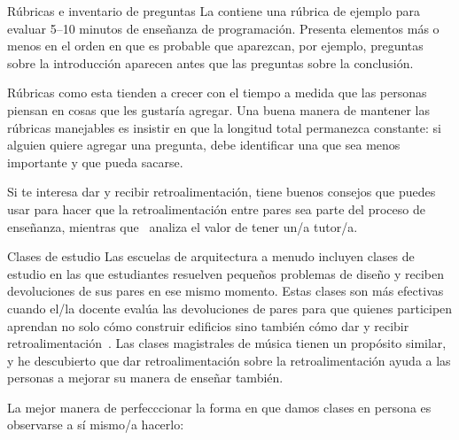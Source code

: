 \begin{aside}{Rúbricas e inventario de preguntas}
  La  contiene una rúbrica de ejemplo
  para evaluar 5--10 minutos de enseñanza de programación.
  Presenta elementos más o menos en el orden en que es probable que aparezcan,
  por ejemplo, preguntas sobre la introducción aparecen antes que las preguntas sobre la conclusión.

  Rúbricas como esta
  tienden a crecer con el tiempo a medida que las personas piensan en cosas que les gustaría agregar.
  Una buena manera de mantener las rúbricas manejables es insistir en que
  la longitud total permanezca constante:
  si alguien quiere agregar una pregunta,
  debe identificar una que sea menos importante y que pueda sacarse.
\end{aside}

Si te interesa dar y recibir retroalimentación,
\cite{Gorm2014} tiene buenos consejos
que puedes usar para hacer que la retroalimentación entre pares sea parte del proceso de enseñanza,
mientras que~\cite{Gawa2011} analiza el valor de tener un/a tutor/a.

\begin{aside}{Clases de estudio}
  Las escuelas de arquitectura a menudo incluyen clases de estudio
  en las que estudiantes resuelven pequeños problemas de diseño
  y reciben devoluciones de sus pares en ese mismo momento.
  Estas clases son más efectivas cuando el/la docente evalúa las devoluciones de pares
  para que quienes participen aprendan no solo cómo construir edificios
  sino también cómo dar y recibir retroalimentación~\cite{Scho1984}.
  Las clases magistrales de música tienen un propósito similar,
  y he descubierto que dar retroalimentación sobre la retroalimentación
  ayuda a las personas a mejorar su manera de enseñar también.
\end{aside}


La mejor manera de perfecccionar la forma en que damos clases en persona es observarse a sí mismo/a hacerlo:

